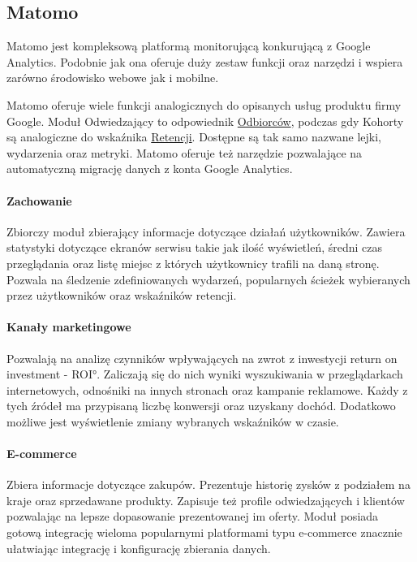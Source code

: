 \subsection{Matomo}
\label{sec:matomo}
Matomo jest kompleksową platformą monitorującą konkurującą z Google Analytics. Podobnie jak ona oferuje duży zestaw funkcji oraz narzędzi i wspiera zarówno środowisko webowe jak i mobilne. 

Matomo oferuje wiele funkcji analogicznych do opisanych usług produktu firmy Google. Moduł Odwiedzający to odpowiednik \hyperref[par:ga-audiences]{Odbiorców}, podczas gdy Kohorty są analogiczne do wskaźnika \hyperref[par:ga-retention]{Retencji}. Dostępne są tak samo nazwane lejki, wydarzenia oraz metryki. Matomo oferuje też narzędzie pozwalające na automatyczną migrację danych z konta Google Analytics.

\paragraph{Zachowanie}
Zbiorczy moduł zbierający informacje dotyczące działań użytkowników. Zawiera statystyki dotyczące ekranów serwisu takie jak ilość wyświetleń, średni czas przeglądania oraz listę miejsc z których użytkownicy trafili na daną stronę. Pozwala na śledzenie zdefiniowanych wydarzeń, popularnych ścieżek wybieranych przez użytkowników oraz wskaźników retencji.

\paragraph{Kanały marketingowe}
Pozwalają na analizę czynników wpływających na zwrot z inwestycji \ang{return on investment - ROI}. Zaliczają się do nich wyniki wyszukiwania w przeglądarkach internetowych, odnośniki na innych stronach oraz kampanie reklamowe. Każdy z tych źródeł ma przypisaną liczbę konwersji oraz uzyskany dochód. Dodatkowo możliwe jest wyświetlenie zmiany wybranych wskaźników w czasie.

\paragraph{E-commerce}
Zbiera informacje dotyczące zakupów. Prezentuje historię zysków z podziałem na kraje oraz sprzedawane produkty. Zapisuje też profile odwiedzających i klientów pozwalając na lepsze dopasowanie prezentowanej im oferty. Moduł posiada gotową integrację wieloma popularnymi platformami typu e-commerce znacznie ułatwiając integrację i konfigurację zbierania danych.

